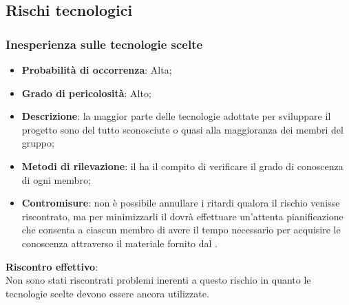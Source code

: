 	\subsection{Rischi tecnologici} %
	\label{sub:rischi_tecnologici}
		\subsubsection{Inesperienza sulle tecnologie scelte} %
		\label{ssub:inesperienza_sulle_tecnlogie_scelte}
			\begin{itemize}
				\item \textbf{Probabilità di occorrenza}: Alta;
				\item \textbf{Grado di pericolosità}: Alto;
				\item \textbf{Descrizione}: la maggior parte delle tecnologie adottate per sviluppare il progetto sono del tutto sconosciute o quasi alla maggioranza dei membri del gruppo;
				\item \textbf{Metodi di rilevazione}: il \roleProjectManager{} ha il compito di verificare il grado di conoscenza di ogni membro;
				\item \textbf{Contromisure}: non è possibile annullare i ritardi qualora il rischio venisse riscontrato, ma per minimizzarli il \roleProjectManager{} dovrà effettuare un'attenta pianificazione che consenta a ciascun membro di avere il tempo necessario per acquisire le conoscenza attraverso il materiale fornito dal \roleAdministrator.
			\end{itemize}
		\noindent
		\textbf{Riscontro effettivo}: \\
		Non sono stati riscontrati problemi inerenti a questo rischio in quanto le tecnologie scelte devono essere ancora utilizzate.
		
